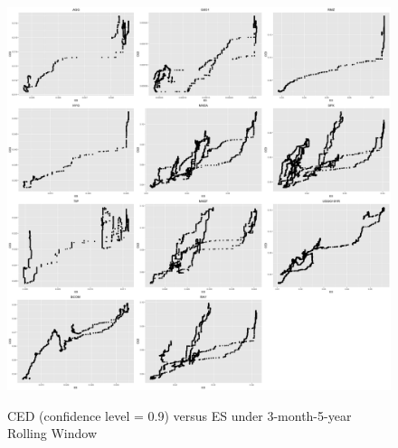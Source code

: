 \begin{figure}[h]
\caption{CED (confidence level = 0.9) versus ES under 3-month-5-year Rolling Window} 
\centering 
\includegraphics[width=15cm]{../results/CED_ES_3mon_5yr5yr}
\label{fig: CED_ES_3mon_5yr5yr}
\end{figure}

\fi
